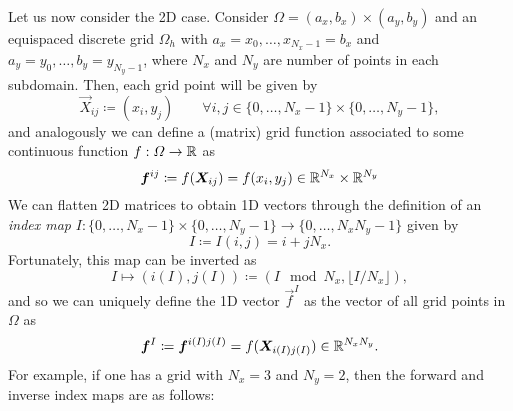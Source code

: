 Let us now consider the 2D case. Consider $\Omega = (a_x, b_x) \times (a_y, b_y)$ and an equispaced discrete grid $\Omega_h$ with $ a_x = x_0, \hdots, x_{N_x-1} = b_x$ and $a_y = y_0, \hdots, b_y = y_{N_y-1}$, where $N_x$ and $N_y$ are number of points in each subdomain. Then, each grid point will be given by     
    \begin{equation}
        \vec X_{ij} \coloneqq (x_i, y_j) \qquad \forall i,j \in \{0,\hdots, N_x-1\}\times \{0,\hdots, N_y-1\},
    \end{equation}
and analogously we can define a (matrix) grid function associated to some continuous function $f:\Omega\to \mathbb{R}$ as 
\begin{equation*}
    \vec f^{ij} \coloneqq f(\vec X_{ij}) = f(x_i, y_j) \in \R^{N_x}\times \R^{N_y}
\end{equation*}
We can flatten 2D matrices to obtain 1D vectors through the definition of an \emph{index map} $I: \{0,\hdots, N_x-1\} \times \{0, \hdots, N_y-1\}\to \{0,\hdots, N_x N_y-1\}$ given by 
\begin{equation*}
    I \coloneqq I(i,j) = i + j N_x.
\end{equation*}
Fortunately, this map can be inverted as
\begin{equation*}
    I \mapsto (i(I), j(I)) \coloneqq (I\mod N_x, \lfloor I/N_x \rfloor),
\end{equation*}
and so we can uniquely define the 1D vector $\vec f^I$ as the vector of all grid points in $\Omega$ as
\begin{equation*}
    \vec f^I \coloneqq \vec f^{i(I)j(I)} = f(\vec X_{i(I)j(I)}) \in \R^{N_x N_y}.
\end{equation*}
For example, if one has a grid with $N_x=3$ and $N_y=2$, then the forward and inverse index maps are as follows:
